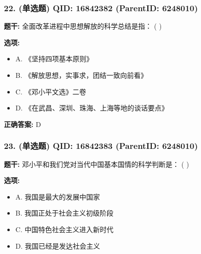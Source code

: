 \documentclass[12pt,UTF8]{ctexart}
\begin{document}
\vspace{0.3em}\hrulefill\vspace{0.7em}

\subsubsection*{22. (单选题) \small QID: 16842382 (ParentID: 6248010)}

\textbf{题干:}
全面改革进程中思想解放的科学总结是指： ( )



\textbf{选项:}
\begin{itemize}[leftmargin=*]

  \item A. 《坚持四项基本原则》

  \item B. 《解放思想，实事求，团结一致向前看》

  \item C. 《邓小平文选》二卷

  \item D. 《在武昌、深圳、珠海、上海等地的谈话要点》

\end{itemize}

\textbf{正确答案:}
D

\vspace{0.3em}\hrulefill\vspace{0.7em}

\subsubsection*{23. (单选题) \small QID: 16842383 (ParentID: 6248010)}

\textbf{题干:}
邓小平和我们党对当代中国基本国情的科学判断是： ( )



\textbf{选项:}
\begin{itemize}[leftmargin=*]

  \item A. 我国是最大的发展中国家

  \item B. 我国正处于社会主义初级阶段

  \item C. 中国特色社会主义进入新时代

  \item D. 我国已经是发达社会主义

\end{itemize}
\end{document}
